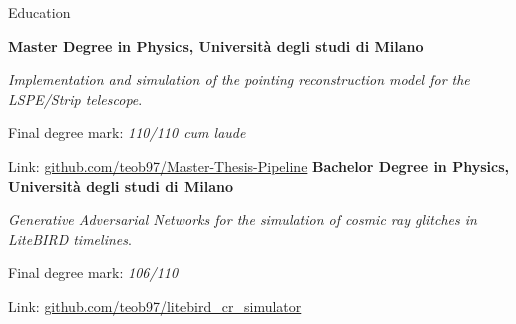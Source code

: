\begin{rubric}{Education}

\entry*[04/2023]%
	\textbf{Master Degree in Physics, Università degli studi di Milano}
	\par \emph{Implementation and simulation of the pointing reconstruction model for the LSPE/Strip telescope}.
    \par Final degree mark: \emph{110/110 cum laude}
    \par Link: \href{https://github.com/teob97/Master-Thesis-Pipeline}{github.com/teob97/Master-Thesis-Pipeline}
%
\entry*[12/2020]%
	\textbf{Bachelor Degree in Physics, Università degli studi di Milano}
    \par \emph{Generative Adversarial Networks for the simulation of cosmic ray glitches in LiteBIRD timelines}.
    \par Final degree mark: \emph{106/110}
    \par Link: \href{https://github.com/teob97/litebird_cr_simulator}{github.com/teob97/litebird\_cr\_simulator}
\end{rubric}
